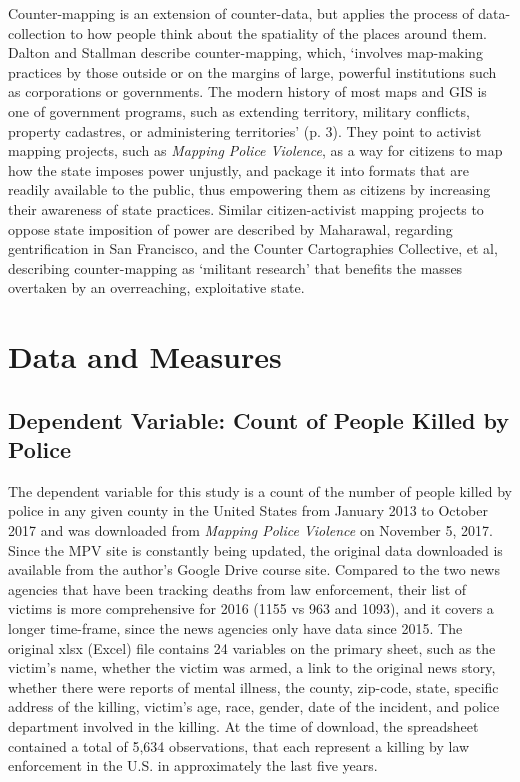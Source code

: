 \documentclass[sigconf]{acmart}
\begin{document}
Counter-mapping is an extension of counter-data, but applies the process of data-collection to how people think about the spatiality of the places around them.  Dalton and Stallman describe counter-mapping, which, `involves map-making practices by those outside or on the margins of large, powerful institutions such as corporations or governments. The modern history of most maps and GIS is one of government programs, such as extending territory, military conflicts, property cadastres, or administering territories' (p. 3). \cite{dalton17}  They point to activist mapping projects, such as {\em Mapping Police Violence}, as a way for citizens to map how the state imposes power unjustly, and package it into formats that are readily available to the public, thus empowering them as citizens by increasing their awareness of state practices. Similar citizen-activist mapping projects to oppose state imposition of power are described by Maharawal, regarding gentrification in San Francisco, and the Counter Cartographies Collective, et al, describing counter-mapping as `militant research' that benefits the masses overtaken by an overreaching, exploitative state. \cite{maharawal17,ccc12}

\section{Data and Measures}
\subsection{Dependent Variable: Count of People Killed by Police}
The dependent variable for this study is a count of the number of people killed by police in any given county in the United States from January 2013 to October 2017 and was downloaded from {\em Mapping Police Violence} on November 5, 2017. \cite{policeviolence}  Since the MPV site is constantly being updated, the original data downloaded is available from the author's Google Drive course site. \cite{townsleyG} Compared to the two news agencies that have been tracking deaths from law enforcement, their list of victims is more comprehensive for 2016 (1155 vs 963 and 1093), and it covers a longer time-frame, since the news agencies only have data since 2015.  The original xlsx (Excel) file contains 24 variables on the primary sheet, such as the victim's name, whether the victim was armed, a link to the original news story, whether there were reports of mental illness, the county, zip-code, state, specific address of the killing, victim's age, race, gender, date of the incident, and police department involved in the killing. At the time of download, the spreadsheet contained a total of 5,634 observations, that each represent a killing by law enforcement in the U.S. in approximately the last five years.
\end{document}
